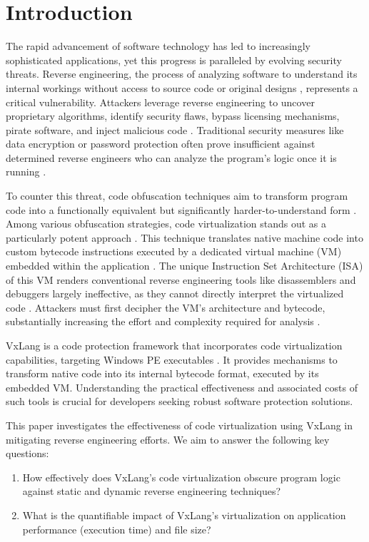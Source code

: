 \section{Introduction}
The rapid advancement of software technology has led to increasingly sophisticated applications, yet this progress is paralleled by evolving security threats. Reverse engineering, the process of analyzing software to understand its internal workings without access to source code or original designs \cite{Has18}, represents a critical vulnerability. Attackers leverage reverse engineering to uncover proprietary algorithms, identify security flaws, bypass licensing mechanisms, pirate software, and inject malicious code \cite{Wak24}. Traditional security measures like data encryption or password protection often prove insufficient against determined reverse engineers who can analyze the program's logic once it is running \cite{Sec19}.

To counter this threat, code obfuscation techniques aim to transform program code into a functionally equivalent but significantly harder-to-understand form \cite{Jin24}. Among various obfuscation strategies, code virtualization stands out as a particularly potent approach \cite{Ore06, Zho24}. This technique translates native machine code into custom bytecode instructions executed by a dedicated virtual machine (VM) embedded within the application \cite{Don20}. The unique Instruction Set Architecture (ISA) of this VM renders conventional reverse engineering tools like disassemblers and debuggers largely ineffective, as they cannot directly interpret the virtualized code \cite{Salwan2018SymbolicDeobfuscation}. Attackers must first decipher the VM's architecture and bytecode, substantially increasing the effort and complexity required for analysis \cite{Hac24}.

VxLang is a code protection framework that incorporates code virtualization capabilities, targeting Windows PE executables \cite{VxLang}. It provides mechanisms to transform native code into its internal bytecode format, executed by its embedded VM. Understanding the practical effectiveness and associated costs of such tools is crucial for developers seeking robust software protection solutions.

This paper investigates the effectiveness of code virtualization using VxLang in mitigating reverse engineering efforts. We aim to answer the following key questions:
\begin{enumerate}
    \item How effectively does VxLang's code virtualization obscure program logic against static and dynamic reverse engineering techniques?
    \item What is the quantifiable impact of VxLang's virtualization on application performance (execution time) and file size?
\end{enumerate}


